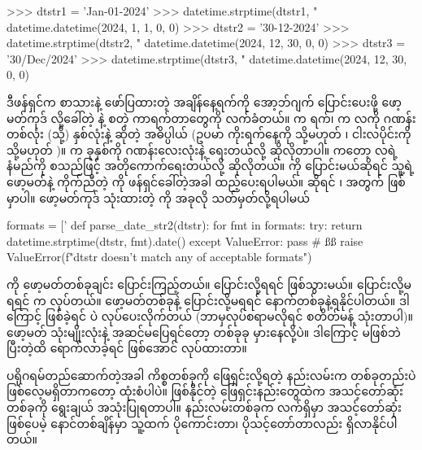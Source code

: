 \begin{codetxt}
>>> dtstr1 = 'Jan-01-2024'
>>> datetime.strptime(dtstr1, "%
datetime.datetime(2024, 1, 1, 0, 0)
>>> dtstr2 = '30-12-2024'
>>> datetime.strptime(dtstr2, "%
datetime.datetime(2024, 12, 30, 0, 0)
>>> dtstr3 = '30/Dec/2024'
>>> datetime.strptime(dtstr3, "%
datetime.datetime(2024, 12, 30, 0, 0)
\end{codetxt}
ဒီဖန်ရှင်က စာသားနဲ့ ဖော်ပြထားတဲ့ အချိန်နေ့ရက်ကို  အော့ဘ်ဂျက် ပြောင်းပေးဖို့ ဖော့မတ်ကုဒ်  လို့ခေါ်တဲ့ \fCode{\%} နဲ့ စတဲ့ ကာရက်တာတွေကို လက်ခံတယ်။  က ရက်၊  က   လကို ဂဏန်း တစ်လုံး (သို့) နှစ်လုံးနဲ့ ဆိုတဲ့ အဓိပ္ပါယ် (ဥပမာ ကိုးရက်နေ့ကို  သို့မဟုတ် ၊ ငါးလပိုင်းကို  သို့မဟုတ် )။  က ခုနှစ်ကို ဂဏန်းလေးလုံးနဲ့ ရေးတယ်လို့ ဆိုလိုတာပါ။  ကတော့ လရဲ့ နံမည်ကို  စသည်ဖြင့် အတိုကောက်ရေးတယ်လို့ ဆိုလိုတယ်။  ကို ပြောင်းမယ်ဆိုရင် သူ့ရဲ့ဖော့မတ်နဲ့ ကိုက်ညီတဲ့  ကို ဖန်ရှင်ခေါ်တဲ့အခါ ထည့်ပေးရပါမယ်။  ဆိုရင် ၊  အတွက်  ဖြစ်မှာပါ။ ဖော့မတ်ကုဒ် သုံးထားတဲ့  ကို အခုလို သတ်မှတ်လို့ရပါမယ်
%
\begin{py}
formats = ['%
def parse_date_str2(dtstr):
    for fmt in formats:
        try:
            return datetime.strptime(dtstr, fmt).date()
        except ValueError:
            pass
    # ßß
    raise ValueError(f"{dtstr} doesn't match any of acceptable formats")
\end{py}
%
 ကို ဖော့မတ်တစ်ခုချင်း ပြောင်းကြည့်တယ်။ ပြောင်းလို့ရရင်  ဖြစ်သွားမယ်။ ပြောင်းလို့မရရင်  က   လုပ်တယ်။  ဖော့မတ်တစ်ခုနဲ့ ပြောင်းလို့မရရင် နောက်တစ်ခုနဲ့ရနိုင်ပါတယ်။ ဒါကြောင့်  ဖြစ်ခဲ့ရင်   ပဲ လုပ်ပေးလိုက်တယ် (ဘာမှလုပ်စရာမလိုရင်  စတိတ်မန့် သုံးတာပါ)။ ဖော့မတ် သုံးမျိုးလုံးနဲ့ အဆင်မပြေရင်တော့ တစ်ခုခု မှားနေလို့ပဲ။ ဒါကြောင့်  မဖြစ်ဘဲ   ပြီးတဲ့ထိ ရောက်လာခဲ့ရင်   ဖြစ်အောင်  လုပ်ထားတာ။

ပရိုဂရမ်တည်ဆောက်တဲ့အခါ ကိစ္စတစ်ခုကို ဖြေရှင်းလို့ရတဲ့ နည်းလမ်းက တစ်ခုတည်းပဲ ဖြစ်လေ့မရှိတာကတော့ ထုံးစံပါပဲ။ ဖြစ်နိုင်တဲ့ ဖြေရှင်းနည်းတွေထဲက အသင့်တော်ဆုံးတစ်ခုကို ရွေးချယ် အသုံးပြုရတာပါ။ နည်းလမ်းတစ်ခုက လက်ရှိမှာ အသင့်တော်ဆုံး ဖြစ်ပေမဲ့ နောင်တစ်ချိန်မှာ သူ့ထက် ပိုကောင်းတာ၊ ပိုသင့်တော်တာလည်း ရှိလာနိုင်ပါတယ်။

